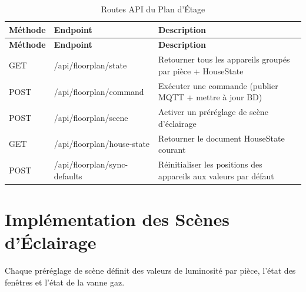 \begin{center}
\begin{longtable}{p{} p{} p{}}
\caption{Routes API du Plan d'Étage}\label{tab:floorplan_api}\\
\toprule
\textbf{Méthode} & \textbf{Endpoint} & \textbf{Description} \\
\midrule
\endfirsthead
\toprule
\textbf{Méthode} & \textbf{Endpoint} & \textbf{Description} \\
\midrule
\endhead
\bottomrule
\endfoot
GET  & /api/floorplan/state       & Retourner tous les appareils groupés par pièce + HouseState \\
POST & /api/floorplan/command     & Exécuter une commande (publier MQTT + mettre à jour BD) \\
POST & /api/floorplan/scene       & Activer un préréglage de scène d'éclairage \\
GET  & /api/floorplan/house-state & Retourner le document HouseState courant \\
POST & /api/floorplan/sync-defaults & Réinitialiser les positions des appareils aux valeurs par défaut \\
\end{longtable}
\end{center}

\section{Implémentation des Scènes d'Éclairage}

Chaque préréglage de scène définit des valeurs de luminosité par pièce, l'état des
fenêtres et l'état de la vanne gaz.

